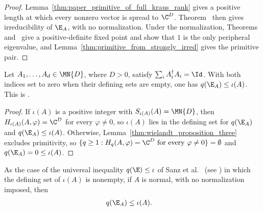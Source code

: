 \begin{proof}
    \leanok
    Lemma~\ref{thm:paper_primitive_of_full_kraus_rank} gives a positive
    length at which every nonzero vector is spread to $\C^D$.
    Theorem~\cite[``Irreducibility from vector spreading'']{QICLean2026Blueprint}
    then gives irreducibility of $\E_A$, with no normalization. Under the
    normalization,
    Theorems~\cite[``Positive-definite fixed point from vector spreading'']{QICLean2026Blueprint}
    and~\cite[``Primitivity from vector spreading'']{QICLean2026Blueprint}
    give a positive-definite fixed point and show that $1$ is the only
    peripheral eigenvalue, and
    Lemma~\ref{thm:primitive_from_strongly_irred} gives the primitive pair.
\end{proof}

\begin{lemma}
    \label{thm:q_index_le_i_index_channel}
    \leanok
    Let $A_1,\ldots,A_d\in\MN{D}$, where $D>0$, satisfy
    $\sum_i A_i^\dagger A_i=\Id$. With both indices set to zero when
    their defining sets are empty, one has $q(\E_A)\le\iota(A)$.
    This is \cite[Proposition~1]{Sanz2010Quantum}.
\end{lemma}

\begin{proof}\leanok
    If $\iota(A)$ is a positive integer with $S_{\iota(A)}(A)=\MN{D}$, then
    $H_{\iota(A)}(A,\varphi)=\C^D$ for every $\varphi\neq0$, so $\iota(A)$
    lies in the defining set for $q(\E_A)$ and $q(\E_A)\le\iota(A)$.
    Otherwise, Lemma~\ref{thm:wielandt_proposition_three} excludes
    primitivity, so
    $\{q\ge1:H_q(A,\varphi)=\C^D\text{ for every }\varphi\neq0\}=\emptyset$
    and $q(\E_A)=0\le\iota(A)$.
\end{proof}

\begin{lemma}
    \label{thm:q_index_le_i_index}
    \leanok
    As the case of the universal inequality
    $q(\E)\le\iota$ of Sanz et al.~\cite[Proposition~1]{Sanz2010Quantum} (see
    \cite{gap:spwc10_wielandt_one_step_subspace}) in which the defining set of
    $\iota(A)$ is nonempty, if $A$ is normal, with no normalization imposed,
    then
    \begin{align}
        q(\E_A) & \le\iota(A).
        \notag
    \end{align}
\end{lemma}

